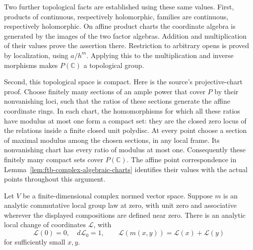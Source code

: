 Two further topological facts are established using these same values.
First, products of continuous, respectively holomorphic, families are
continuous, respectively holomorphic.  On affine product charts the
coordinate algebra is generated by the images of the two factor
algebras.  Addition and multiplication of their values prove the
assertion there.  Restriction to arbitrary opens is proved by
localization, using \(a/h^m\).  Applying this to the multiplication and
inverse morphisms makes \(P(\mathbb C)\) a topological group.

Second, this topological space is compact.  Here is the source's
projective-chart proof.  Choose finitely many sections of an ample
power that cover \(P\) by their nonvanishing loci, such that the ratios
of these sections generate the affine coordinate rings.  In each
chart, the homomorphisms for which all these ratios have modulus at
most one form a compact set: they are the closed zero locus of the
relations inside a finite closed unit polydisc.  At every point choose
a section of maximal modulus among the chosen sections, in any local
frame.  Its nonvanishing chart has every ratio of modulus at most one.
Consequently these finitely many compact sets cover \(P(\mathbb C)\).
The affine point correspondence in
Lemma~\ref{lem:ftb-complex-algebraic-charts} identifies their values with
the actual points throughout this argument.

\begin{srlemma}
\label{lem:ftb-halving-logarithm}
Let \(V\) be a finite-dimensional complex normed vector space.
Suppose \(m\) is an analytic commutative local group law at zero, with
unit zero and associative wherever the displayed compositions are
defined near zero.  There is an analytic local change of coordinates
\(\mathcal L\), with
\[
 \mathcal L(0)=0,\quad d\mathcal L_0=1,\qquad
 \mathcal L(m(x,y))=\mathcal L(x)+\mathcal L(y)                 \tag{CE3}
\]
for sufficiently small \(x,y\).
\end{srlemma}

